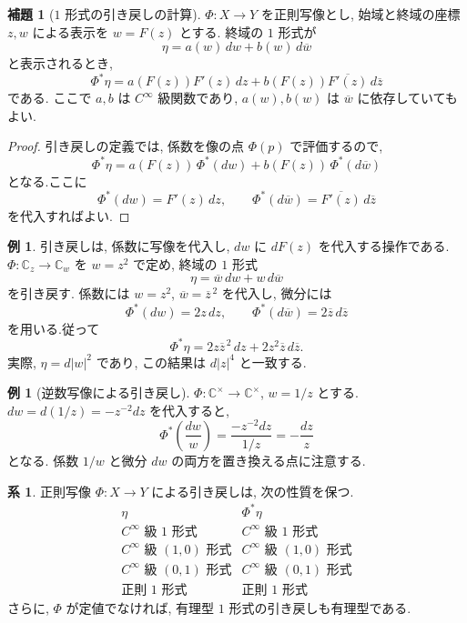 \documentclass[dvipdfmx,a4paper,11pt]{article} %
\newcommand{\C}{\mathbb{C}}
\theoremstyle{definition}
\numberwithin{equation}{section}
\newtheorem{lem}[thm]{補題}
\newtheorem{cor}[thm]{系}
\newtheorem{exa}[thm]{例}
\begin{document}
\begin{lem}[$1$ 形式の引き戻しの計算]\label{O-M111}
$\Phi:X\to Y$ を正則写像とし, 
始域と終域の座標 $z,w$ による表示を $w=F(z)$ とする.
終域の $1$ 形式が
\[
\eta=a(w)\,dw+b(w)\,d\overline w
\]
と表示されるとき, 
\[
\Phi^*\eta
=a(F(z))F'(z)\,dz
+b(F(z))\overline{F'(z)}\,d\overline z
\]
である.
ここで $a,b$ は $C^\infty$ 級関数であり, 
$a(w),b(w)$ は $\overline w$ に依存していてもよい.
\end{lem}

\begin{proof}
引き戻しの定義では, 係数を像の点 $\Phi(p)$ で評価するので, 
\[
\Phi^*\eta
=a(F(z))\,\Phi^*(dw)
+b(F(z))\,\Phi^*(d\overline w)
\]
となる.ここに
\[
\Phi^*(dw)=F'(z)\,dz,\qquad
\Phi^*(d\overline w)=\overline{F'(z)}\,d\overline z
\]
を代入すればよい.
\end{proof}

\begin{exa}
引き戻しは, 係数に写像を代入し, $dw$ に $dF(z)$ を代入する操作である.
$\Phi:\C_z\to\C_w$ を $w=z^2$ で定め, 
終域の $1$ 形式
\[
\eta=\overline w\,dw+w\,d\overline w
\]
を引き戻す.
係数には $w=z^2$, $\overline w=\overline z^{\,2}$ を代入し, 
微分には
\[
\Phi^*(dw)=2z\,dz,\qquad
\Phi^*(d\overline w)=2\overline z\,d\overline z
\]
を用いる.従って
\[
\Phi^*\eta
=2z\overline z^{\,2}\,dz
 +2z^2\overline z\,d\overline z.
\]
実際, $\eta=d|w|^2$ であり, この結果は $d|z|^4$ と一致する.
\end{exa}
\begin{exa}[逆数写像による引き戻し]
$\Phi:\C^\times\to\C^\times$, $w=1/z$ とする.
$dw=d(1/z)=-z^{-2}dz$ を代入すると,
\[
\Phi^*\left(\frac{dw}{w}\right)
=\frac{-z^{-2}dz}{1/z}=-\frac{dz}{z}
\]
となる. 係数 $1/w$ と微分 $dw$ の両方を置き換える点に注意する.
\end{exa}


\begin{cor}\label{O-M112}
正則写像 $\Phi:X\to Y$ による引き戻しは, 次の性質を保つ.
\[
\begin{array}{c|c}
\eta&\Phi^*\eta\\ \hline
C^\infty\text{ 級 }1\text{ 形式}&C^\infty\text{ 級 }1\text{ 形式}\\
C^\infty\text{ 級 }(1,0)\text{ 形式}&C^\infty\text{ 級 }(1,0)\text{ 形式}\\
C^\infty\text{ 級 }(0,1)\text{ 形式}&C^\infty\text{ 級 }(0,1)\text{ 形式}\\
\text{正則 }1\text{ 形式}&\text{正則 }1\text{ 形式}
\end{array}
\]
さらに, $\Phi$ が定値でなければ, 有理型 $1$ 形式の引き戻しも有理型である.
\end{cor}
\end{document}
